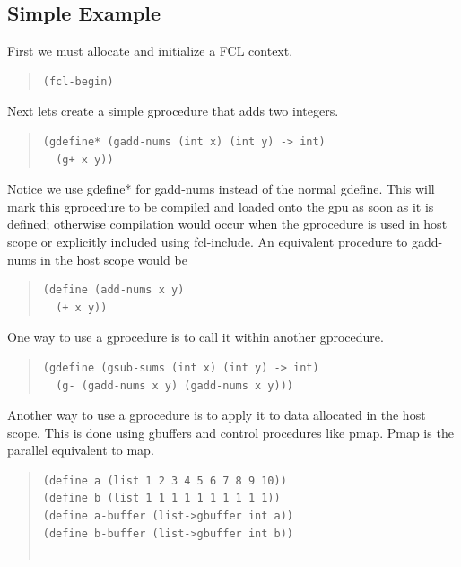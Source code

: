 \documentclass{article}
\begin{document}
{\subsection{Simple Example}

{\raggedright{}
First we must allocate and initialize a FCL context.
}
\begin{quote}
\begin{verbatim}
(fcl-begin)
\end{verbatim}
\end{quote}

{\raggedright{}
Next lets create a simple gprocedure that adds two integers.
}

\begin{quote}
\begin{verbatim}
(gdefine* (gadd-nums (int x) (int y) -> int)
  (g+ x y))
\end{verbatim}
\end{quote}

{\raggedright{}
Notice we use gdefine* for gadd-nums instead of the normal gdefine. This will mark this gprocedure
to be compiled and loaded onto the gpu as soon as it is defined; otherwise compilation
would occur when the
gprocedure is used in host scope or explicitly included using fcl-include.
An equivalent procedure to gadd-nums in the host scope would be
}

\begin{quote}
\begin{verbatim}
(define (add-nums x y)
  (+ x y))
\end{verbatim}
\end{quote}

{\raggedright{}
One way to use a gprocedure is to call it within another gprocedure.
}

\begin{quote}
\begin{verbatim}
(gdefine (gsub-sums (int x) (int y) -> int)
  (g- (gadd-nums x y) (gadd-nums x y)))
\end{verbatim}
\end{quote}

{\raggedright{}
Another way to use a gprocedure is to apply it to data allocated in the host scope.
This is done using gbuffers and control procedures like pmap. Pmap is the parallel
equivalent to map.
}

\begin{quote}
\begin{verbatim}
(define a (list 1 2 3 4 5 6 7 8 9 10))
(define b (list 1 1 1 1 1 1 1 1 1 1))
(define a-buffer (list->gbuffer int a))
(define b-buffer (list->gbuffer int b))


\end{verbatim}
\end{quote}}
\end{document}
